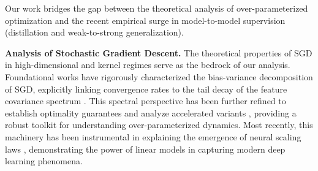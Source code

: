 \documentclass{article}
\theoremstyle{definition}
\theoremstyle{definition}
\theoremstyle{plain}
\theoremstyle{plain}
\theoremstyle{plain}
\theoremstyle{plain}
\theoremstyle{plain}
\begin{document}
Our work bridges the gap between the theoretical analysis of over-parameterized optimization and the recent empirical surge in model-to-model supervision (distillation and weak-to-strong generalization).

\textbf{Analysis of Stochastic Gradient Descent.} 
The theoretical properties of SGD in high-dimensional and kernel regimes serve as the bedrock of our analysis. 
Foundational works have rigorously characterized the bias-variance decomposition of SGD, explicitly linking convergence rates to the tail decay of the feature covariance spectrum \citep{dieuleveut2016nonparametricstochasticapproximationlarge, zou2021benign, wu2022last, zhang2025learningcurvesstochasticgradient}. 
This spectral perspective has been further refined to establish optimality guarantees and analyze accelerated variants \citep{jain2018accelerating, pan2022eigencurveoptimallearningrate, li2023riskboundsacceleratedsgd, zhang2024optimalityacceleratedsgdhighdimensional}, providing a robust toolkit for understanding over-parameterized dynamics.
Most recently, this machinery has been instrumental in explaining the emergence of neural scaling laws \citep{Atanasov2024ScalingAR, lin2025scalinglawslinearregression}, demonstrating the power of linear models in capturing modern deep learning phenomena.

\end{document}
